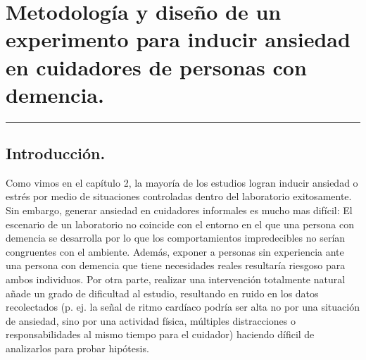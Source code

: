 \chapter{Metodolog\'ia y dise\~no de un experimento para inducir ansiedad en cuidadores de personas con demencia.}\label{capit:cap3}
\vspace{-2.0325ex}%
\noindent
\rule{\textwidth}{0.5pt}
\vspace{-5.5ex}%
\newcommand{\pushline}{\Indp}%
\section{Introducci\'on.}\label{secc:introduction}

Como vimos en el cap\'itulo 2, la mayor\'ia de los estudios logran inducir ansiedad o estr\'es por medio de situaciones controladas dentro del laboratorio exitosamente. Sin embargo, generar ansiedad en cuidadores informales es mucho mas dif\'icil: El escenario de un laboratorio no coincide con el entorno en el que una persona con demencia se desarrolla por lo que los comportamientos impredecibles no ser\'ian congruentes con el ambiente. Adem\'as, exponer a personas sin experiencia ante una persona con demencia que tiene necesidades reales resultar\'ia riesgoso para ambos individuos. Por otra parte, realizar una intervenci\'on totalmente natural a\~nade un grado de dificultad al estudio, resultando en ruido en los datos recolectados (p. ej. la se\~nal de ritmo card\'iaco podr\'ia ser alta no por una situaci\'on de ansiedad, sino por una actividad f\'isica, m\'ultiples distracciones o responsabilidades al mismo tiempo para el cuidador) haciendo d\'ificil de analizarlos para probar hip\'otesis.

